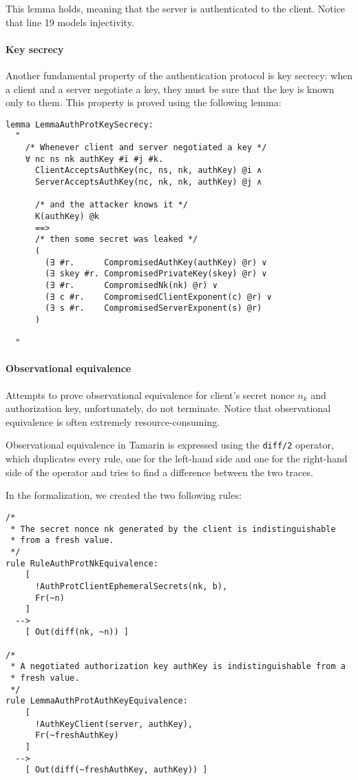 This lemma holds, meaning that the server is authenticated to the client. Notice that line 19 models injectivity.

\paragraph{Key secrecy}
Another fundamental property of the authentication protocol is key secrecy: when a client and a server negotiate a key, they must be sure that the key is known only to them. This property is proved using the following lemma:
\begin{lstlisting}
lemma LemmaAuthProtKeySecrecy:
  "
    /* Whenever client and server negotiated a key */
    ∀ nc ns nk authKey #i #j #k.
      ClientAcceptsAuthKey(nc, ns, nk, authKey) @i ∧
      ServerAcceptsAuthKey(nc, nk, nk, authKey) @j ∧

      /* and the attacker knows it */
      K(authKey) @k
      ==>
      /* then some secret was leaked */
      (
        (∃ #r.      CompromisedAuthKey(authKey) @r) ∨
        (∃ skey #r. CompromisedPrivateKey(skey) @r) ∨
        (∃ #r.      CompromisedNk(nk) @r) ∨
        (∃ c #r.    CompromisedClientExponent(c) @r) ∨
        (∃ s #r.    CompromisedServerExponent(s) @r)
      )

  "
\end{lstlisting}

\paragraph{Observational equivalence}
Attempts to prove observational equivalence for client's secret nonce $n_k$ and authorization key, unfortunately, do not terminate. Notice that observational equivalence is often extremely resource-consuming.

Observational equivalence in Tamarin is expressed using the \lstinline{diff/2} operator, which duplicates every rule, one for the left-hand side and one for the right-hand side of the operator and tries to find a difference between the two traces.

In the formalization, we created the two following rules:

\begin{lstlisting}
/*
 * The secret nonce nk generated by the client is indistinguishable 
 * from a fresh value.
 */
rule RuleAuthProtNkEquivalence:
    [
      !AuthProtClientEphemeralSecrets(nk, b),
      Fr(~n)
    ]
  -->
    [ Out(diff(nk, ~n)) ]

/*
 * A negotiated authorization key authKey is indistinguishable from a 
 * fresh value.
 */
rule LemmaAuthProtAuthKeyEquivalence:
    [
      !AuthKeyClient(server, authKey),
      Fr(~freshAuthKey)
    ]
  -->
    [ Out(diff(~freshAuthKey, authKey)) ]
\end{lstlisting}






